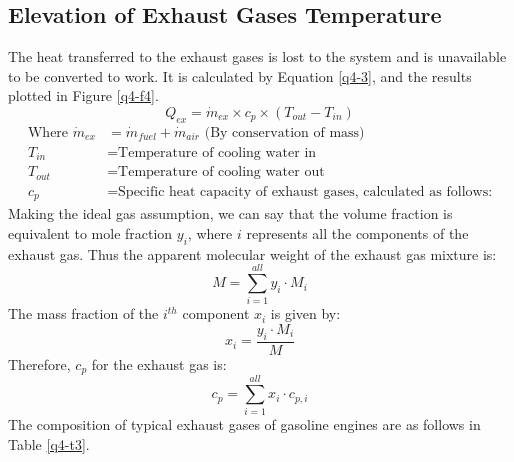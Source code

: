 \subsection*{Elevation of Exhaust Gases Temperature}
The heat transferred to the exhaust gases is lost to the system and is unavailable to be converted to work. It is calculated by Equation \ref{q4-3}, and the results plotted in Figure \ref{q4-f4}.
\begin{equation}
    Q_{ex} = \dot{m}_{ex} \times c_p \times (T_{out}-T_{in}) \label{q4-3}
\end{equation}
\begin{align*}
    \textrm{Where }
    \dot{m}_{ex} & = \dot{m}_{fuel} + \dot{m}_{air} \textrm{ (By conservation of mass)}       \\
    T_{in}       & = \textrm{Temperature of cooling water in}                                 \\
    T_{out}      & = \textrm{Temperature of cooling water out}                                \\
    c_p          & = \textrm{Specific heat capacity of exhaust gases, calculated as follows:}
\end{align*}
Making the ideal gas assumption, we can say that the volume fraction is equivalent to mole fraction $y_i$, where $i$ represents all the components of the exhaust gas. Thus the apparent molecular weight of the exhaust gas mixture is:
\begin{equation}
    M = \sum\limits_{i=1}^{all} y_i \cdot M_i \label{q4-4}
\end{equation}
The mass fraction of the $i^{th}$ component $x_i$ is given by:
\begin{equation}
    x_i= \frac{y_i \cdot M_i}{M} \label{q4-5}
\end{equation}
Therefore, $c_p$ for the exhaust gas is:
\begin{equation}
    c_p = \sum \limits_{i=1}^{all} x_i \cdot c_{p,i} \label{q4-6}
\end{equation}
The composition of typical exhaust gases of gasoline engines are as follows in Table \ref{q4-t3}. \cite{q4-r2} \cite{q4-r3}
